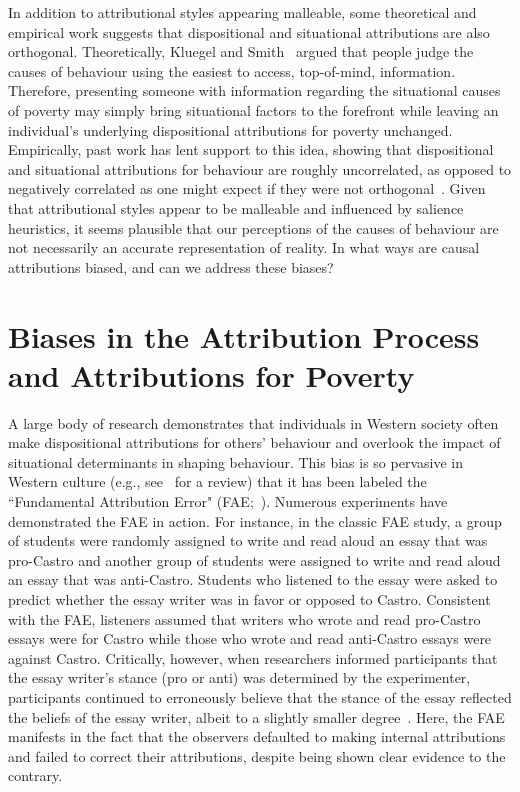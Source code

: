 \documentclass{sfuthesis}
\begin{document}
In addition to attributional styles appearing malleable, some theoretical and empirical work suggests that dispositional and situational attributions are also orthogonal. Theoretically, Kluegel and Smith~\cite{kluegel86} argued that people judge the causes of behaviour using the easiest to access, top-of-mind, information. Therefore, presenting someone with information regarding the situational causes of poverty may simply bring situational factors to the forefront while leaving an individual’s underlying dispositional attributions for poverty unchanged. Empirically, past work has lent support to this idea, showing that dispositional and situational attributions for behaviour are roughly uncorrelated, as opposed to negatively correlated as one might expect if they were not orthogonal~\cite{taylor76, miller81}. Given that attributional styles appear to be malleable and influenced by salience heuristics, it seems plausible that our perceptions of the causes of behaviour are not necessarily an accurate representation of reality. In what ways are causal attributions biased, and can we address these biases?

\section{Biases in the Attribution Process and Attributions for Poverty}

A large body of research demonstrates that individuals in Western society often make dispositional attributions for others’ behaviour and overlook the impact of situational determinants in shaping behaviour. This bias is so pervasive in Western culture (e.g., see~\cite{morris94} for a review) that it has been labeled the “Fundamental Attribution Error" (FAE;~\cite{ross77}). Numerous experiments have demonstrated the FAE in action. For instance, in the classic FAE study, a group of students were randomly assigned to write and read aloud an essay that was pro-Castro and another group of students were assigned to write and read aloud an essay that was anti-Castro. Students who listened to the essay were asked to predict whether the essay writer was in favor or opposed to Castro. Consistent with the FAE, listeners assumed that writers who wrote and read pro-Castro essays were for Castro while those who wrote and read anti-Castro essays were against Castro. Critically, however, when researchers informed participants that the essay writer’s stance (pro or anti) was determined by the experimenter, participants continued to erroneously believe that the stance of the essay reflected the beliefs of the essay writer, albeit to a slightly smaller degree~\cite{jones67}. Here, the FAE manifests in the fact that the observers defaulted to making internal attributions and failed to correct their attributions, despite being shown clear evidence to the contrary.
\end{document}
